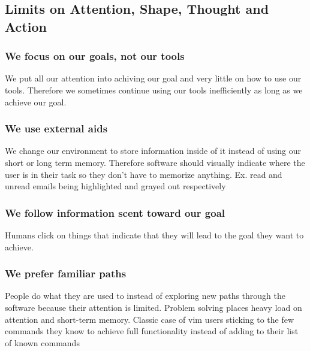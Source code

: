 \documentclass[11pt,]{article}
\begin{document}
\hypertarget{limits-on-attention-shape-thought-and-action}{%
\subsection{Limits on Attention, Shape, Thought and
Action}\label{limits-on-attention-shape-thought-and-action}}

\hypertarget{we-focus-on-our-goals-not-our-tools}{%
\subsubsection{We focus on our goals, not our
tools}\label{we-focus-on-our-goals-not-our-tools}}

We put all our attention into achiving our goal and very little on how
to use our tools. Therefore we sometimes continue using our tools
inefficiently as long as we achieve our goal.

\hypertarget{we-use-external-aids}{%
\subsubsection{We use external aids}\label{we-use-external-aids}}

We change our environment to store information inside of it instead of
using our short or long term memory. Therefore software should visually
indicate where the user is in their task so they don't have to memorize
anything. Ex. read and unread emails being highlighted and grayed out
respectively

\hypertarget{we-follow-information-scent-toward-our-goal}{%
\subsubsection{We follow information scent toward our
goal}\label{we-follow-information-scent-toward-our-goal}}

Humans click on things that indicate that they will lead to the goal
they want to achieve.

\hypertarget{we-prefer-familiar-paths}{%
\subsubsection{We prefer familiar
paths}\label{we-prefer-familiar-paths}}

People do what they are used to instead of exploring new paths through
the software because their attention is limited. Problem solving places
heavy load on attention and short-term memory. Classic case of vim users
sticking to the few commands they know to achieve full functionality
instead of adding to their list of known commands
\end{document}

